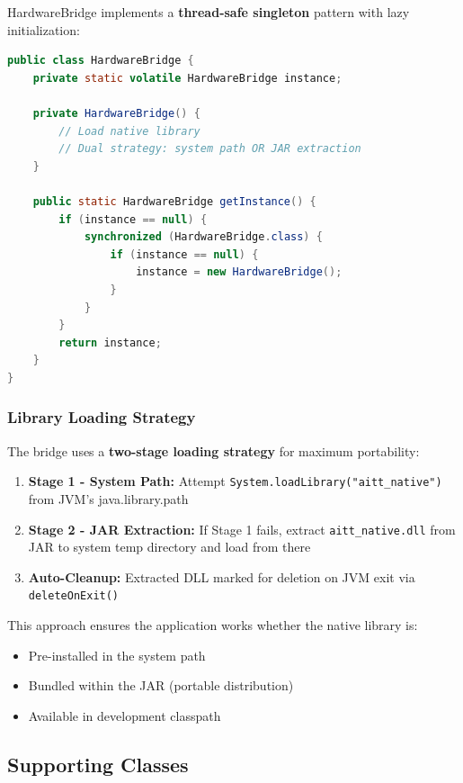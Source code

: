 \documentclass[12pt,a4paper]{article}
\begin{document}
HardwareBridge implements a \textbf{thread-safe singleton} pattern with lazy initialization:

\begin{lstlisting}[language=Java, caption=HardwareBridge Singleton Pattern]
public class HardwareBridge {
    private static volatile HardwareBridge instance;
    
    private HardwareBridge() {
        // Load native library
        // Dual strategy: system path OR JAR extraction
    }
    
    public static HardwareBridge getInstance() {
        if (instance == null) {
            synchronized (HardwareBridge.class) {
                if (instance == null) {
                    instance = new HardwareBridge();
                }
            }
        }
        return instance;
    }
}
\end{lstlisting}

\subsubsection{Library Loading Strategy}

The bridge uses a \textbf{two-stage loading strategy} for maximum portability:

\begin{enumerate}
    \item \textbf{Stage 1 - System Path:} Attempt \texttt{System.loadLibrary("aitt\_native")} from JVM's java.library.path
    \item \textbf{Stage 2 - JAR Extraction:} If Stage 1 fails, extract \texttt{aitt\_native.dll} from JAR to system temp directory and load from there
    \item \textbf{Auto-Cleanup:} Extracted DLL marked for deletion on JVM exit via \texttt{deleteOnExit()}
\end{enumerate}

This approach ensures the application works whether the native library is:
\begin{itemize}
    \item Pre-installed in the system path
    \item Bundled within the JAR (portable distribution)
    \item Available in development classpath
\end{itemize}

\subsection{Supporting Classes}
\end{document}

